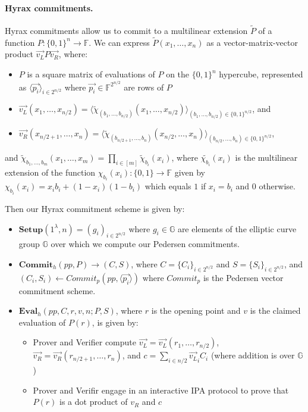 \paragraph{Hyrax commitments.}
Hyrax commitments \cite{SP:WTSTW18} allow us to commit to a multilinear extension $\widetilde{P}$ of a function $P:\{0,1\}^n \rightarrow \mathbb{F}$. We can express $\widetilde{P}(x_1, \dots, x_n)$ as a vector-matrix-vector product $\vec{v_L} P \vec{v_R}$, where:
\begin{itemize}
    \item $P$ is a square matrix of evaluations of $P$ on the $\{0,1\}^{n}$ hypercube, represented as $\langle \vec{p_i}\rangle_{i \in 2^{n/2}}$ where $\vec{p_i} \in \mathbb{F}^{2^{n/2}}$ are rows of $P$
    \item $\vec{v_L}(x_1, \dots, x_{n/2}) = \langle \widetilde{\chi}_{(b_1, \dots, b_{n/2})}(x_1, \dots, x_{n/2})\rangle _{(b_1, \dots, b_{n/2})\in \{0,1\}^{n/2}}$, and 
    \item $\vec{v_R}(x_{n/2+1}, \dots, x_{n}) = \langle \widetilde{\chi}_{(b_{n/2+1}, \dots, b_{n})}(x_{n/2}, \dots, x_{n})\rangle_{(b_{n/2}, \dots, b_{n}) \in \{0,1\}^{n/2}}$,
\end{itemize}
and $\widetilde{\chi}_{b_1, \dots, b_m} (x_1, \dots, x_m) = \prod_{i \in [m]} \widetilde{\chi}_{b_i}(x_i)$, where
$\widetilde{\chi_{b_i}}(x_i)$ is the multilinear extension of the function $\chi_{b_i}(x_i): \{0,1\} \rightarrow \mathbb{F}$ given by $\chi_{b_i}(x_i) = x_ib_i + (1-x_i)(1-b_i)$ which equals $1$ if $x_i = b_i$ and $0$ otherwise.

Then our Hyrax commitment scheme is given by:
\begin{itemize}
    \item $\textbf{Setup}(1^{\lambda}, n) = (g_i)_{i \in 2^{n/2}}$ where $g_i \in \mathbb{G}$ are elements of the elliptic curve group $\mathbb{G}$ over which we compute our Pedersen commitments.
    \item $\textbf{Commit}_h(pp, P) \rightarrow (C,S)$, where 
    $C = \{C_i\}_{i \in 2^{n/2}}$ and $S = \{S_i\}_{i \in 2^{n/2}}$, and
    $(C_i, S_i) \leftarrow Commit_p(pp, \langle \vec{p_i} \rangle)$
    where $Commit_p$ is the Pedersen vector commitment scheme.
    \item $\textbf{Eval}_h(pp, C, r, v, n; P, S)$, where $r$ is the opening point and $v$ is the claimed evaluation of $P(r)$, is given by:
    \begin{itemize}
        \item Prover and Verifier compute $\vec{v_L} = \vec{v_L}(r_1, \dots, r_{n/2})$, $\vec{v_R} = \vec{v_R}(r_{n/2+1}, \dots, r_{n})$, 
    and $c = \sum_{i \in {n/2}} \vec{v_L}_i C_i$ (where addition is over $\mathbb{G}$)
        \item Prover and Verifir engage in an interactive IPA protocol to prove that $P(r)$ is a dot product of $v_R$ and $c$ 
    \end{itemize} 
\end{itemize} 

